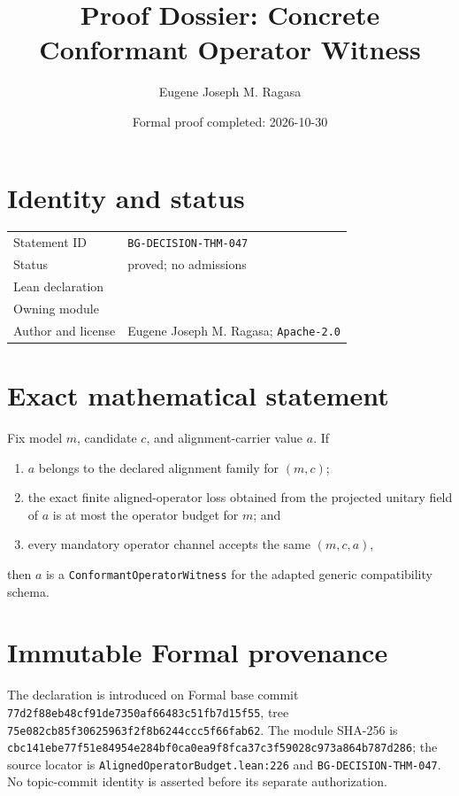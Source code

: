 \documentclass[11pt]{article}
\title{Proof Dossier: Concrete Conformant Operator Witness}
\author{Eugene Joseph M. Ragasa}
\date{Formal proof completed: 2026-10-30}
\begin{document}
\raggedright
\maketitle

\section{Identity and status}
\begin{tabularx}{\textwidth}{@{}lY@{}}
\toprule
Statement ID & \texttt{BG-DECISION-THM-047} \\
Status & proved; no admissions \\
Lean declaration &  \\
Owning module &  \\
Author and license & Eugene Joseph M. Ragasa; \texttt{Apache-2.0} \\
\bottomrule
\end{tabularx}

\section{Exact mathematical statement}
Fix model $m$, candidate $c$, and alignment-carrier value $a$.  If
\begin{enumerate}
\item $a$ belongs to the declared alignment family for $(m,c)$;
\item the exact finite aligned-operator loss obtained from the projected unitary field of $a$ is at most the operator budget for $m$; and
\item every mandatory operator channel accepts the same $(m,c,a)$,
\end{enumerate}
then $a$ is a \texttt{ConformantOperatorWitness} for the adapted generic compatibility schema.

\section{Immutable Formal provenance}
The declaration is introduced on Formal base commit
\texttt{77d2f88eb48cf91de7350af66483c51fb7d15f55}, tree
\texttt{75e082cb85f30625963f2f8b6244ccc5f66fab62}.  The module SHA-256 is
\texttt{cbc141ebe77f51e84954e284bf0ca0ea9f8fca37c3f59028c973a864b787d286}; the source locator is \texttt{AlignedOperatorBudget.lean:226} and \texttt{BG-DECISION-THM-047}.  No topic-commit identity is asserted before its separate authorization.
\end{document}
